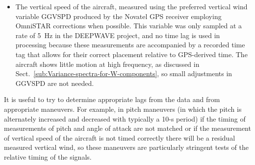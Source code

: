 \documentclass[12pt,twoside,english]{article}\usepackage[]{graphicx}\usepackage[]{color}
\let\OrgIndex\index
\renewcommand*{\index}[1]{\OrgIndex{#1}}
\begin{document}
{{\begin{itemize}
the analysis summarized in Appendix B suggests that the relatively long pressure lines involved in the measurement of dynamic pressure might introduce a
),lag that varies from 28~ms at total pressure of 1000~hPa to 38~ms at a total pressure of 100~hPa. Therefore an appropriate delay time for dynamic pressure is approximately $-40$~ms. The sensor used for measurement of total temperature (RTRL for DEEPWAVE) has a response time of about 1~s or more, but no delay is used in processing. Because airspeed affects the measurement of vertical wind only as a multiplicative factor (cf.~\eqref{eq:VWind}), changes of even a few percent in airspeed or temperature have only insignificant effects on the vertical wind, so these time lags are unimportant here.
\item The vertical speed of the aircraft, measured using the preferred vertical wind variable GGVSPD produced by the Novatel GPS receiver employing OmniSTAR corrections when possible. This variable was only sampled at a rate of 5~Hz in the DEEPWAVE project, and no time lag is used in processing because these measurements are accompanied by a recorded time tag that allows for their correct placement relative to GPS-derived time. The aircraft shows little motion at high frequency, as discussed in Sect.~\ref{sub:Variance-spectra-for-W-components}, so small adjustments in GGVSPD are not needed.

\end{itemize}
It is useful to try to determine appropriate lags from the data and from appropriate maneuvers. For example, in pitch maneuvers (in which the pitch is alternately increased and decreased with typically a 10-s period) if the timing of measurements of pitch and angle of attack are not matched or if the measurement of vertical speed of the aircraft is not timed correctly there will be a residual measured vertical wind, so these maneuvers are particularly stringent tests of the relative timing of the signals.





}}
\end{document}

